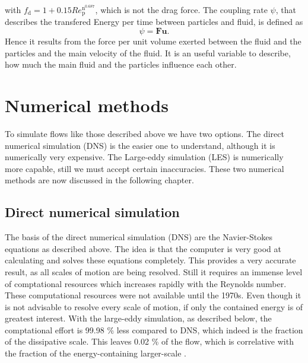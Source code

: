 \documentclass[11pt,a4paper,openany,oneside,parskip=half*]{article}
\renewcommand*\vec[1]{\boldsymbol{#1}}
\begin{document}
with $f_\mathrm{d} = 1+0.15Re_\mathrm{p}^\mathrm{n^{0.687}}$, which is not the drag force.
\newline
{}
\nomenclature{$\vec{x}_\mathrm{p}$}{Particle position}
\nomenclature{$\vec{v}_\mathrm{p}$}{Particle velocity}
The coupling rate $\psi$, that describes the transfered Energy per time between particles and fluid, is defined as
\begin{equation}
\psi = \vec{F} \vec{u}. 
\end{equation}
Hence it results from the force per unit volume exerted between the fluid and the particles and the main velocity of the fluid.
It is an useful variable to describe, how much the main fluid and the particles influence each other.
\pagebreak
\section{Numerical methods} %
To simulate flows like those described above we have two options. The direct numerical simulation (DNS) is the easier one to understand, although it is numerically very expensive. The Large-eddy simulation (LES) is numerically more capable, still we must accept certain inaccuracies. These two numerical methods are now discussed in the following chapter.
\subsection{Direct numerical simulation}
The basis of the direct numerical simulation (DNS) are the Navier-Stokes equations as described above. The idea is that the computer is very good at calculating and solves these equations completely. This provides a very accurate result, as all scales of motion are being resolved. Still it requires an immense level of comptational resources which increases rapidly with the Reynolds number. These computational resources were not available until the 1970s. Even though it is not advisable to resolve every scale of motion, if only the contained energy is of greatest interest. With the large-eddy simulation, as described below, the comptational effort is 99.98 \% less compared to DNS, which indeed is the fraction of the dissipative scale. This leaves 0.02 \% of the flow, which is correlative with the fraction of the energy-containing larger-scale \cite{turbulentFlows}.%
\end{document}
